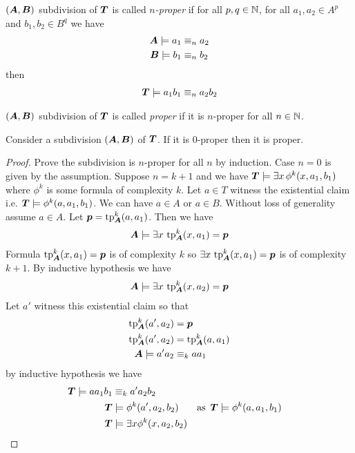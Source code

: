 \documentclass{amsart}
\DeclareMathOperator{\TT}{\boldface T}
\DeclareMathOperator{\A}{\boldface A}
\DeclareMathOperator{\B}{\boldface B}
\begin{document}
\begin{Definition}
	$(\A, \B)$ subdivision of $\TT$ is called \emph{$n$-proper} if for all $p,q \in \mathbb{N}$, for all $a_1, a_2 \in A^p$ and $b_1, b_2 \in B^q$ we have
	\begin{align*}
		\A \models a_1 &\equiv_n a_2 \\
		\B \models b_1 &\equiv_n b_2
	\end{align*}
	then
	\begin{align*}
		\TT \models a_1b_1 \equiv_n a_2b_2
	\end{align*}
\end{Definition}

\begin{Definition}
	$(\A, \B)$ subdivision of $\TT$ is called \emph{proper} if it is $n$-proper for all $n \in \mathbb{N}$.
\end{Definition}

\begin{Lemma} \label{lm_subdivision}
	Consider a subdivision $(\A, \B)$ of $\TT$. If it is $0$-proper then it is proper.
\end{Lemma}

\begin{proof}
	Prove the subdivision is $n$-proper for all $n$ by induction. Case $n = 0$ is given by the assumption. Suppose $n = k + 1$ and we have $\TT \models \exists x \, \phi^k(x, a_1, b_1)$ where $\phi^k$ is some formula of complexity $k$. Let $a \in T$ witness the existential claim i.e. $\TT \models \phi^k(a, a_1, b_1)$. We can have $a \in A$ or $a \in B$. Without loss of generality assume $a \in A$. Let $\pp = \tp^k_{\A} (a, a_1)$. Then we have 
	\begin{align*}
		\A \models \exists x \, \tp^k_{\A}(x, a_1) = \pp
	\end{align*}
	Formula $\tp^k_{\A}(x, a_1) = \pp$ is of complexity $k$ so $\exists x \, \tp^k_{\A}(x, a_1) = \pp$ is of complexity $k+1$. By inductive hypothesis we have
	\begin{align*}
		\A \models \exists x \, \tp^k_{\A}(x, a_2) = \pp
	\end{align*}
	Let $a'$ witness this existential claim so that  
	\begin{align*}
		\tp^k_{\A}(a', a_2) &= \pp \\
		\tp^k_{\A}(a', a_2) &= \tp^k_{\A}(a, a_1) \\
		\A \models a'a_2 &\equiv_k aa_1
	\end{align*}
	by inductive hypothesis we have
	\begin{align*}
		\TT \models aa_1b_1 &\equiv_k a'a_2b_2 \\
		\TT &\models \phi^k(a', a_2, b_2) & \text {as } \TT &\models \phi^k(a, a_1, b_1)\\
		\TT &\models \exists x \phi^k(x, a_2, b_2)
	\end{align*}
\end{proof}
\end{document}
